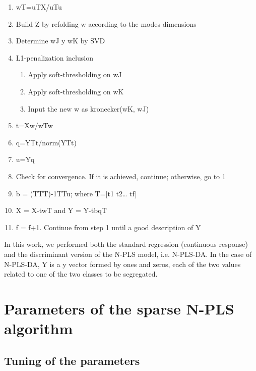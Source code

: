 \begin{enumerate}
    \item wT=uTX/uTu
    \item Build Z by refolding w according to the modes dimensions
    \item Determine wJ y wK by SVD
    \item L1-penalization inclusion
    \begin{enumerate}
        \item Apply soft-thresholding on wJ
        \item Apply soft-thresholding on wK
        \item Input the new w as kronecker(wK, wJ)
    \end{enumerate}
    \item t=Xw/wTw
    \item q=YTt/norm(YTt)
    \item u=Yq
    \item Check for convergence. If it is achieved, continue; otherwise, go to 1
    \item b = (TTT)-1TTu; where T=[t1 t2… tf]
    \item X = X-twT and Y = Y-tbqT
    \item f = f+1. Continue from step 1 until a good description of Y
\end{enumerate}
\vspace{20pt}

In this work, we performed both the standard regression (continuous response) and the discriminant version of the N-PLS model, i.e. N-PLS-DA. In the case of N-PLS-DA, Y is a y vector formed by ones and zeros, each of the two values related to one of the two classes to be segregated. 



\section{Parameters of the sparse N-PLS algorithm}
\subsection{Tuning of the parameters}